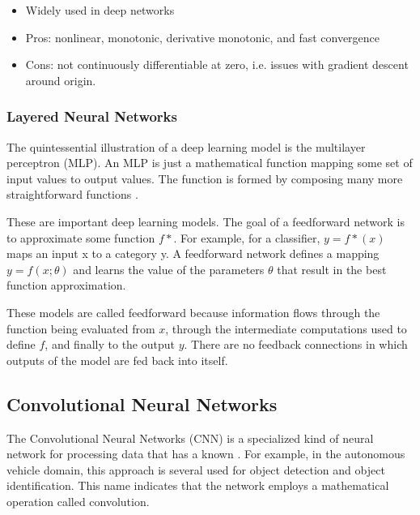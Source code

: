     \begin{itemize}
        \item Widely used in deep networks
        \item Pros: nonlinear, monotonic, derivative monotonic, and fast convergence
        \item Cons: not continuously differentiable at zero, i.e. issues with gradient descent around origin.
    \end{itemize}

\subsubsection{Layered Neural Networks}

The quintessential illustration of a deep learning model is the multilayer perceptron (MLP). An MLP is just a mathematical function mapping some set of input values to output values. The function
is formed by composing many more straightforward functions \cite{goodfellow2016deep}.


These are important deep learning models. The goal
of a feedforward network is to approximate some function $f*$. For example, for a classifier, $y = f*(x)$ maps an input x to a category y. A feedforward network
defines a mapping $y = f (x; \theta)$ and learns the value of the parameters $\theta$ that result in the best function approximation.

These models are called feedforward because information flows through the function being evaluated from $x$, through the intermediate computations used to define $f$, and finally to the output $y$. There are no feedback connections in which outputs of the model are fed back into itself.



\subsection{Convolutional Neural Networks}\label{sec:cnn}


The Convolutional Neural Networks (CNN) is a specialized kind of neural network for processing data that has a known \cite{lecun1995convolutional}. For example, in the autonomous vehicle domain, this approach is several used for object detection and object identification. This name  indicates that the network employs a mathematical operation called
convolution. 

